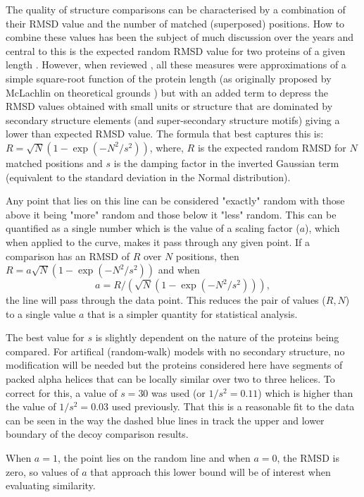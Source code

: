 The quality of structure comparisons can be characterised by a combination of their
RMSD value and the number of matched (superposed) positions.  How to combine these values has
been the subject of much discussion over the years and central to this is the expected random
RMSD value for two proteins of a given length \cite{Mclaughlin,Cohen,Crippen}.   However,
when reviewed \cite{Taylor}, all these measures were approximations of a simple square-root function of
the protein length (as originally proposed by McLachlin on theoretical grounds \cite{McLachlin})
but with an added term to depress the RMSD values obtained with small units or structure
that are dominated by secondary structure elements (and super-secondary structure motifs) 
giving a lower than expected RMSD value.   The formula that best captures this is:
$R = \surd N (1-\exp(-N^2/s^2))$,
where,
$R$ is the expected random RMSD for $N$ matched positions and $s$ is the damping factor in the inverted
Gaussian term (equivalent to the standard deviation in the Normal distribution).  

Any point that lies on this line can be considered "exactly" random
with those above it being "more" random and those below it "less" random.  This can be quantified
as a single number which is the value of a scaling factor ($a$), which when applied to the curve, makes it
pass through any given point.   If a comparison has an RMSD of $R$ over $N$ positions, then
$R = a\surd N (1-\exp(-N^2/s^2))$ and when
\begin{equation}
\label{Eqn:fit}
a = R/(\surd N (1-\exp(-N^2/s^2))), 
\end{equation}
the line will pass through the data point.  This reduces the pair of values ($R,N$) to a
single value $a$ that is a simpler quantity for statistical analysis.

The best value for $s$ is slightly dependent on the nature of the proteins being compared.
For artifical (random-walk)  models with no secondary structure, no modification will be needed but the
proteins considered here have segments of packed alpha helices that can be locally similar
over two to three helices.   To correct for this, a value of $s=30$ was used (or $1/s^2 = 0.11$)
which is higher than the value of $1/s^2 = 0.03$ used previously.
That this is a reasonable fit to the data can be seen in the way the dashed blue lines
in  track the upper and lower boundary of the decoy comparison results.

When $a=1$, the point lies on the random line and when $a=0$, the RMSD is zero, so values of
$a$ that approach this lower bound will be of interest when evaluating similarity. 

